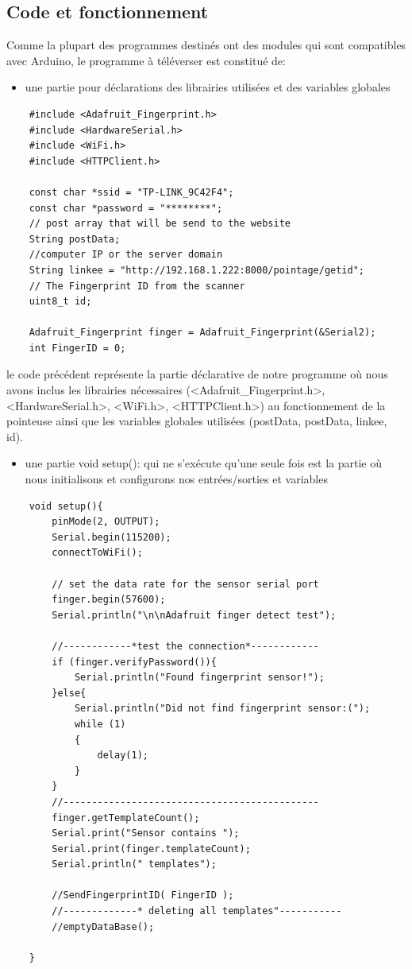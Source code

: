 \subsection{Code et fonctionnement}    
Comme la plupart des programmes destinés ont des modules qui sont compatibles
avec Arduino, le programme à téléverser est constitué de: 

\begin{itemize}
    \item [\textbullet] une partie pour déclarations des librairies utilisées et
        des variables globales
\end{itemize}

\begin{verbatim}
    #include <Adafruit_Fingerprint.h>
    #include <HardwareSerial.h>
    #include <WiFi.h>
    #include <HTTPClient.h>

    const char *ssid = "TP-LINK_9C42F4";
    const char *password = "********";
    // post array that will be send to the website
    String postData;    
    //computer IP or the server domain 
    String linkee = "http://192.168.1.222:8000/pointage/getid"; 
    // The Fingerprint ID from the scanner
    uint8_t id; 

    Adafruit_Fingerprint finger = Adafruit_Fingerprint(&Serial2);
    int FingerID = 0;
\end{verbatim}

le code précédent représente la partie déclarative de notre programme où nous
avons inclus les librairies nécessaires (<Adafruit\_Fingerprint.h>,
<HardwareSerial.h>, <WiFi.h>, <HTTPClient.h>) au fonctionnement de la pointeuse
ainsi que les variables globales utilisées (postData, postData, linkee, id).

\begin{itemize}
    \item [\textbullet] une partie void setup(): qui ne s’exécute qu’une seule
        fois est la partie où nous initialisons et configurons nos
        entrées/sorties et variables 
\end{itemize}    

\begin{verbatim}
    void setup(){
        pinMode(2, OUTPUT);
        Serial.begin(115200);
        connectToWiFi();

        // set the data rate for the sensor serial port
        finger.begin(57600);
        Serial.println("\n\nAdafruit finger detect test");

        //------------*test the connection*------------
        if (finger.verifyPassword()){
            Serial.println("Found fingerprint sensor!");
        }else{
            Serial.println("Did not find fingerprint sensor:(");
            while (1)
            {
                delay(1);
            }
        }
        //---------------------------------------------
        finger.getTemplateCount();
        Serial.print("Sensor contains ");
        Serial.print(finger.templateCount);
        Serial.println(" templates");

        //SendFingerprintID( FingerID );
        //-------------* deleting all templates"-----------
        //emptyDataBase();

    }
\end{verbatim}

